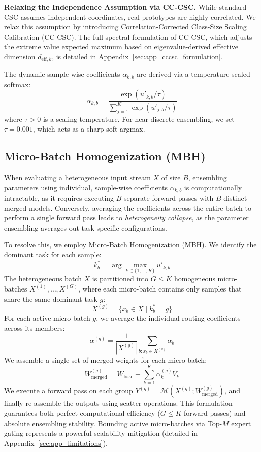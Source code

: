 \textbf{Relaxing the Independence Assumption via CC-CSC.} While standard CSC assumes independent coordinates, real prototypes are highly correlated. We relax this assumption by introducing Correlation-Corrected Class-Size Scaling Calibration (CC-CSC). The full spectral formulation of CC-CSC, which adjusts the extreme value expected maximum based on eigenvalue-derived effective dimension $d_{\text{eff}, k}$, is detailed in Appendix~\ref{sec:app_cccsc_formulation}.

The dynamic sample-wise coefficients $\alpha_{k, b}$ are derived via a temperature-scaled softmax:
\begin{equation}
\alpha_{k, b} = \frac{\exp(u'_{k, b} / \tau)}{\sum_{j=1}^K \exp(u'_{j, b} / \tau)}
\end{equation}
where $\tau > 0$ is a scaling temperature. For near-discrete ensembling, we set $\tau = 0.001$, which acts as a sharp soft-argmax.

\subsection{Micro-Batch Homogenization (MBH)}
When evaluating a heterogeneous input stream $X$ of size $B$, ensembling parameters using individual, sample-wise coefficients $\alpha_{k, b}$ is computationally intractable, as it requires executing $B$ separate forward passes with $B$ distinct merged models. Conversely, averaging the coefficients across the entire batch to perform a single forward pass leads to \emph{heterogeneity collapse}, as the parameter ensembling averages out task-specific configurations.

To resolve this, we employ Micro-Batch Homogenization (MBH). We identify the dominant task for each sample:
\begin{equation}
k^*_b = \arg\max_{k \in \{1,\dots, K\}} u'_{k, b}
\end{equation}
The heterogeneous batch $X$ is partitioned into $G \le K$ homogeneous micro-batches $X^{(1)}, \dots, X^{(G)}$, where each micro-batch contains only samples that share the same dominant task $g$:
\begin{equation}
X^{(g)} = \{x_b \in X \mid k^*_b = g\}
\end{equation}
For each active micro-batch $g$, we average the individual routing coefficients across its members:
\begin{equation}
\bar{\alpha}^{(g)} = \frac{1}{|X^{(g)}|} \sum_{b: x_b \in X^{(g)}} \alpha_{b}
\end{equation}
We assemble a single set of merged weights for each micro-batch:
\begin{equation}
W_{\text{merged}}^{(g)} = W_{\text{base}} + \sum_{k=1}^K \bar{\alpha}_k^{(g)} V_k
\end{equation}
We execute a forward pass on each group $Y^{(g)} = \mathcal{M}(X^{(g)}; W_{\text{merged}}^{(g)})$, and finally re-assemble the outputs using scatter operations. This formulation guarantees both perfect computational efficiency ($G \le K$ forward passes) and absolute ensembling stability. Bounding active micro-batches via Top-$M$ expert gating represents a powerful scalability mitigation (detailed in Appendix~\ref{sec:app_limitations}).
